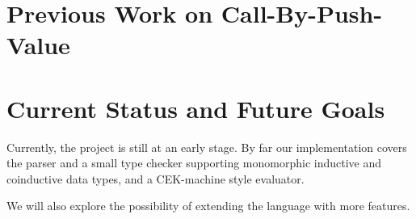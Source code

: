 \documentclass[acmsmall,nonacm]{acmart}
\begin{document}
\section{Previous Work on Call-By-Push-Value}

\section{Current Status and Future Goals}

Currently, the project is still at an early stage. By far our implementation covers the parser and a small type checker supporting monomorphic inductive and coinductive data types, and a CEK-machine style evaluator.

We will also explore the possibility of extending the language with more features.
\end{document}
